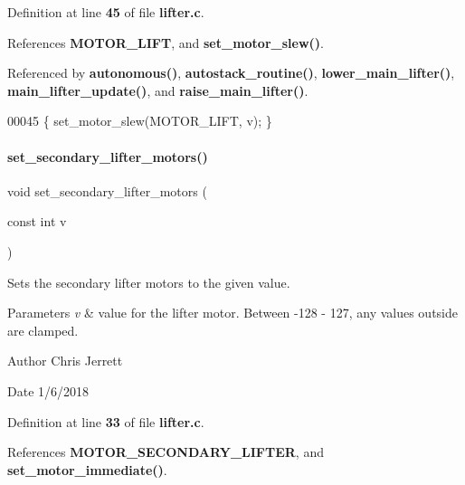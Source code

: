 Definition at line \textbf{ 45} of file \textbf{ lifter.\+c}.



References \textbf{ M\+O\+T\+O\+R\+\_\+\+L\+I\+FT}, and \textbf{ set\+\_\+motor\+\_\+slew()}.



Referenced by \textbf{ autonomous()}, \textbf{ autostack\+\_\+routine()}, \textbf{ lower\+\_\+main\+\_\+lifter()}, \textbf{ main\+\_\+lifter\+\_\+update()}, and \textbf{ raise\+\_\+main\+\_\+lifter()}.


\begin{DoxyCode}
00045 \{ set_motor_slew(MOTOR_LIFT, v); \}
\end{DoxyCode}
\mbox{\label{a00026_a78640d547d9361951a92d0bc00939536}} 
\paragraph{set\+\_\+secondary\+\_\+lifter\+\_\+motors()}
{\footnotesize\ttfamily void set\+\_\+secondary\+\_\+lifter\+\_\+motors (\begin{DoxyParamCaption}\item[{const int}]{v }\end{DoxyParamCaption})}



Sets the secondary lifter motors to the given value. 


\begin{DoxyParams}{Parameters}
{\em v} & value for the lifter motor. Between -\/128 -\/ 127, any values outside are clamped. \\
\hline
\end{DoxyParams}
\begin{DoxyAuthor}{Author}
Chris Jerrett 
\end{DoxyAuthor}
\begin{DoxyDate}{Date}
1/6/2018 
\end{DoxyDate}


Definition at line \textbf{ 33} of file \textbf{ lifter.\+c}.



References \textbf{ M\+O\+T\+O\+R\+\_\+\+S\+E\+C\+O\+N\+D\+A\+R\+Y\+\_\+\+L\+I\+F\+T\+ER}, and \textbf{ set\+\_\+motor\+\_\+immediate()}.




